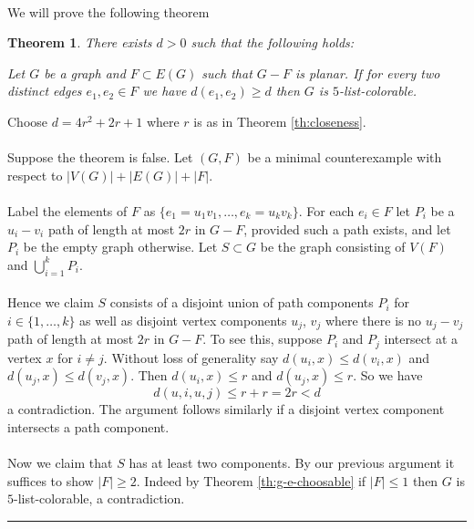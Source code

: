 \documentclass[letterpaper,12pt,oneside,onecolumn]{article}
\newenvironment{proof}{{\bf Proof:  }}{\hfill\rule{2mm}{2mm}}
\newtheorem{theorem}[fact]{Theorem}
\begin{document}
\paragraph{}
We will prove the following theorem
\begin{theorem}
	There exists $d>0$ such that the following holds:
	
	Let $G$ be a graph and $F \subset E(G)$ such that $G-F$ is planar. If for every two distinct edges $e_1, e_2 \in F$ we have $d(e_1, e_2) \geq d$ then $G$ is $5$-list-colorable.
\end{theorem}
\begin{proof}
Choose $d = 4r^2+2r+1$ where $r$ is as in Theorem \ref{th:closeness}.
\paragraph{}
Suppose the theorem is false. Let $(G,F)$ be a minimal counterexample with respect to $|V(G)| + |E(G)| + |F|$.
\paragraph{}
Label the elements of $F$ as $\{e_1=u_1v_1, \dots, e_k = u_kv_k\}$. For each $e_i \in F$ let $P_i$ be a $u_i-v_i$ path of length at most $2r$ in $G-F$, provided such a path exists, and let $P_i$ be the empty graph otherwise. Let $S\subset G$ be the graph consisting of $V(F)$ and $\bigcup_{i=1}^k P_i$.
\paragraph{}
Hence we claim $S$ consists of a disjoint union of path components $P_i$ for $i \in \{1,\dots, k\}$ as well as disjoint vertex components $u_j$, $v_j$ where there is no $u_j-v_j$ path of length at most $2r$ in $G-F$. To see this, suppose $P_i$ and $P_j$ intersect at a vertex $x$ for $i\neq j$. Without loss of generality say $d(u_i,x) \leq d(v_i,x)$ and $d(u_j, x) \leq d(v_j, x)$. Then $d(u_i, x) \leq r$ and $d(u_j,x) \leq r$. So we have
$$d(u,i,u,j) \leq r + r = 2r < d$$
a contradiction. The argument follows similarly if a disjoint vertex component intersects a path component.
\paragraph{}
Now we claim that $S$ has at least two components. By our previous argument it suffices to show $|F| \geq 2$. Indeed by Theorem \ref{th:g-e-choosable} if $|F| \leq 1$ then $G$ is $5$-list-colorable, a contradiction.

\end{proof}
\end{document}
